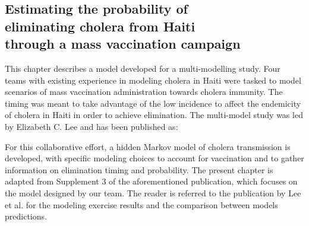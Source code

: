 \begin{fullwidth}
\chapter[Estimating the probability of eliminating cholera from Haiti through a mass vaccination campaign]{Estimating the probability of \\ eliminating cholera from Haiti \\ through a mass vaccination campaign}%

This chapter describes a model developed for a multi-modelling study. Four teams with existing experience in modeling cholera in Haiti were tasked to model scenarios of mass vaccination administration towards cholera immunity. The timing was meant to take advantage of the low incidence to affect the endemicity of cholera in Haiti in order to achieve elimination. The multi-model study was led by Elizabeth C. Lee and has been published as:



For this collaborative effort, a hidden Markov model of cholera transmission is developed, with specific modeling choices to account for vaccination and to gather information on elimination timing and probability.
The present chapter is adapted from Supplement 3 of the aforementioned publication, which focuses on the model designed by our team. The reader is referred to the publication by Lee et al. for the modeling exercise results and the comparison between models predictions.
\label{ch:cholera-haiti-ocv}
\end{fullwidth}


